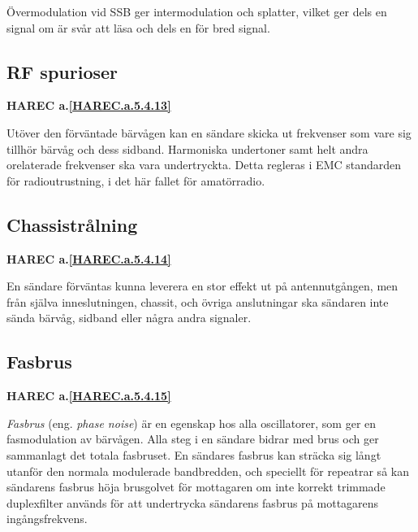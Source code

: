 Övermodulation vid SSB ger intermodulation och splatter, vilket ger dels en
signal om är svår att läsa och dels en för bred signal.

\subsection{RF spurioser}
\textbf{HAREC
  a.\ref{HAREC.a.5.4.13}\label{myHAREC.a.5.4.13}
}

Utöver den förväntade bärvågen kan en sändare skicka ut frekvenser som vare
sig tillhör bärvåg och dess sidband. Harmoniska undertoner samt helt andra
orelaterade frekvenser ska vara undertryckta.
Detta regleras i EMC standarden för radioutrustning, i det här fallet för
amatörradio.

\subsection{Chassistrålning}
\textbf{HAREC
  a.\ref{HAREC.a.5.4.14}\label{myHAREC.a.5.4.14}
}

En sändare förväntas kunna leverera en stor effekt ut på antennutgången, men
från själva inneslutningen, chassit, och övriga anslutningar ska sändaren
inte sända bärvåg, sidband eller några andra signaler.

\subsection{Fasbrus}
\textbf{HAREC
  a.\ref{HAREC.a.5.4.15}\label{myHAREC.a.5.4.15}
}

\emph{Fasbrus} (eng. \emph{phase noise}) är en egenskap hos alla oscillatorer,
som ger en fasmodulation av bärvågen.
Alla steg i en sändare bidrar med brus och ger sammanlagt det totala fasbruset.
En sändares fasbrus kan sträcka sig långt utanför den normala modulerade
bandbredden, och speciellt för repeatrar så kan sändarens fasbrus höja
brusgolvet för mottagaren om inte korrekt trimmade duplexfilter
används för att undertrycka sändarens fasbrus på mottagarens ingångsfrekvens.
